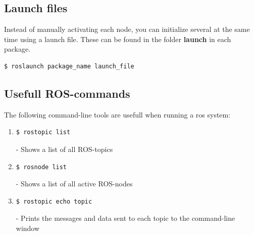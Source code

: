\subsection{Launch files}

Instead of manually activating each node, you can initialize several at the same time using a launch file. These can be found in the folder \textbf{launch} in each package. 

\begin{lstlisting}[language=bash,basicstyle=\mlttfamily, breaklines=true]
  $ roslaunch package_name launch_file
\end{lstlisting}

\subsection{Usefull ROS-commands}

The following command-line tools are usefull when running a ros system: 

\begin{enumerate}
    \item \begin{lstlisting}[language=bash,basicstyle=\mlttfamily, breaklines=true]
  $ rostopic list \end{lstlisting} - Shows a list of all ROS-topics 
  
    \item \begin{lstlisting}[language=bash,basicstyle=\mlttfamily, breaklines=true]
  $ rosnode list\end{lstlisting} -
    Shows a list of all active ROS-nodes
     \item \begin{lstlisting}[language=bash,basicstyle=\mlttfamily, breaklines=true]
  $ rostopic echo topic\end{lstlisting} - Prints the messages and data sent to each topic to the command-line window
\end{enumerate}


